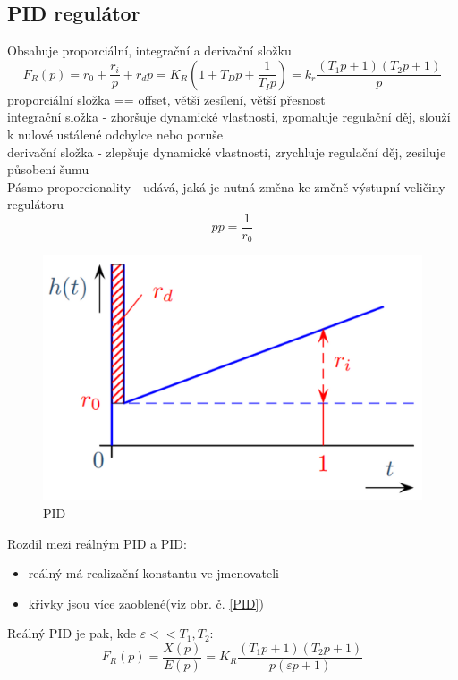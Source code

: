 \subsection*{PID regulátor}
Obsahuje proporciální, integrační a derivační složku
\begin{equation}
    F_R(p) = r_0 + \frac{r_i}{p} + r_d p= K_R(1+T_Dp+\frac{1}{T_Ip}) = k_r\frac{(T_1p+1)(T_2p+1)}{p}
\end{equation}
proporciální složka == offset, větší zesílení, větší přesnost \\
integrační složka - zhoršuje dynamické vlastnosti, zpomaluje regulační děj, slouží k nulové ustálené odchylce nebo poruše\\
derivační složka - zlepšuje dynamické vlastnosti, zrychluje regulační děj, zesiluje působení šumu\\
Pásmo proporcionality - udává, jaká je nutná změna ke změně výstupní veličiny regulátoru
\begin{equation}
    pp = \frac{1}{r_0}
\end{equation}
\begin{figure}[H]
    \includegraphics[scale = 0.3]{images/pasmo_proporcionality.png}
    \caption{PID}
\end{figure}
Rozdíl mezi reálným PID a PID:
\begin{itemize}
    \item reálný má realizační konstantu ve jmenovateli
    \item křivky jsou více zaoblené(viz obr. č. \ref{PID})
\end{itemize}
Reálný PID je pak, kde \(\varepsilon << T_1,T_2\):
\begin{equation}
    F_R(p) = \frac{X(p)}{E(p)} = K_R\frac{(T_1p + 1)(T_2p+1)}{p(\varepsilon p +1)}
\end{equation}
